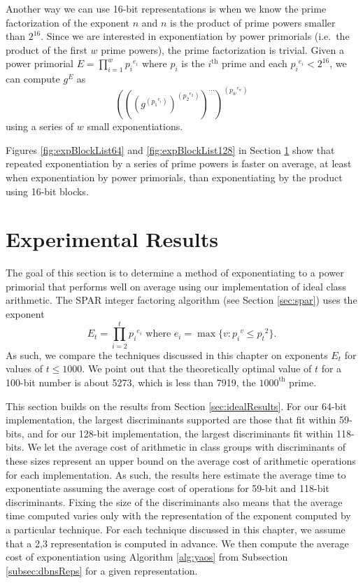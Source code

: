 \documentclass{ucalgthes1}
\theoremstyle{definition}
\begin{document}
Another way we can use 16-bit representations is when we know the prime factorization of the exponent $n$ and $n$ is the product of prime powers smaller than $2^{16}$.  Since we are interested in exponentiation by power primorials (i.e.\ the product of the first $w$ prime powers), the prime factorization is trivial.  Given a power primorial $E = \prod_{i=1}^w {p_i}^{e_i}$ where $p_i$ is the $i^{\textrm{th}}$ prime and each ${p_i}^{e_i} < 2^{16}$, we can compute $g^E$ as
\[
\left(\left(\left(g^{\left({p_1}^{e_i}\right)}\right)
    ^{\left({p_2}^{e_2}\right)}\right)^{\cdots}\right)^{\left({p_w}^{e_w}\right)}
\]
using a series of $w$ small exponentiations.

Figures \ref{fig:expBlockList64} and \ref{fig:expBlockList128} in Section \ref{sec:expResults} show that repeated exponentiation by a series of prime powers is faster on average, at least when exponentiation by power primorials, than exponentiating by the product using 16-bit blocks.

\section{Experimental Results}
\label{sec:expResults}

The goal of this section is to determine a method of exponentiating to a power primorial that performs well on average using our implementation of ideal class arithmetic.  The SPAR integer factoring algorithm (see Section \ref{sec:spar}) uses the exponent
\begin{equation}
\label{eq:expE}
	E_t = \prod_{i=2}^t {p_i}^{e_i} \textrm{ where } e_i = \max \{ v : {p_i}^v \le {p_t}^2 \}.
\end{equation}
As such, we compare the techniques discussed in this chapter on exponents $E_t$ for values of $t \le 1000$.  We point out that the theoretically optimal value of $t$ for a 100-bit number is about 5273, which is less than 7919, the $1000^{\textrm{th}}$ prime.

This section builds on the results from Section \ref{sec:idealResults}.  For our 64-bit implementation, the largest discriminants supported are those that fit within 59-bits, and for our 128-bit implementation, the largest discriminants fit within 118-bits.  We let the average cost of arithmetic in class groups with discriminants of these sizes represent an upper bound on the average cost of arithmetic operations for each implementation.  As such, the results here estimate the average time to exponentiate assuming the average cost of operations for 59-bit and 118-bit discriminants.  Fixing the size of the discriminants also means that the average time computed varies only with the representation of the exponent computed by a particular technique.  For each technique discussed in this chapter, we assume that a 2,3 representation is computed in advance.  We then compute the average cost of exponentiation using Algorithm \ref{alg:yaos} from Subsection \ref{subsec:dbnsReps} for a given representation.
\end{document}
